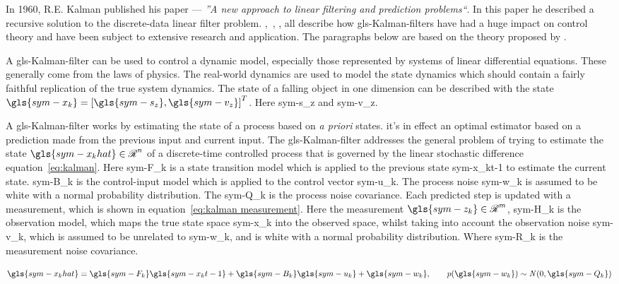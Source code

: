In 1960, R.E. Kalman published his paper \citet{kalman_new_1960} --- \textit{''A new approach to linear filtering and
prediction problems``}. In this paper he described a recursive solution to the discrete-data linear filter problem.
\citet{welch_introduction_2006},~\citet{dandrea_novel_control_2013}, \citet{chui_kalman_1999},
\citet{grewal_kalman_2015} all describe how \gls{gls-Kalman-filter}s have had a huge impact on control theory and have
been subject to extensive research and application. The paragraphs below are based on the theory proposed by
\citet{kalman_new_1960}.

A \gls{gls-Kalman-filter} can be used to control a dynamic model, especially those represented by systems of linear
differential equations. These generally come from the laws of physics. The real-world dynamics are used to model the
state dynamics which should contain a fairly faithful replication of the true system dynamics. The state of a falling
object in one dimension can be described with the state \( \gls{sym-x_k} = \left[\gls{sym-s_z}, \gls{sym-v_z}\right]^T
\). Here \gls{sym-s_z} and \gls{sym-v_z}.

A \gls{gls-Kalman-filter} works by estimating the state of a process based on \textit{a priori} states. it's in effect
an optimal estimator based on a prediction made from the previous input and current input. The \gls{gls-Kalman-filter}
addresses the general problem of trying to estimate the state \( \gls{sym-x_khat} \in \Re^n \) of a discrete-time
controlled process that is governed by the linear stochastic difference equation~\ref{eq:kalman}. Here \gls{sym-F_k} is
a state transition model which is applied to the previous state \gls{sym-x_kt-1} to estimate the current state. 
\gls{sym-B_k} is the control-input model which is applied to the control vector \gls{sym-u_k}. The process noise
\gls{sym-w_k} is assumed to be white with a normal probability distribution. The \gls{sym-Q_k} is the process noise
covariance. Each predicted step is updated with a measurement, which is shown in equation~\ref{eq:kalman measurement}.
Here the measurement \( \gls{sym-z_k} \in \Re^m  \), \gls{sym-H_k} is the observation model, which maps the true
state space \gls{sym-x_k} into the observed space, whilst taking into account the observation noise \gls{sym-v_k}, which
is assumed to be unrelated to \gls{sym-w_k}, and is white with a normal probability distribution. Where \gls{sym-R_k} is
the measurement noise covariance.

\begin{equation}
    \label{eq:kalman}
    \gls{sym-x_khat} = \gls{sym-F_k} \gls{sym-x_kt-1} + \gls{sym-B_k} \gls{sym-u_k} + \gls{sym-w_k}, \qquad p
	(\gls{sym-w_k}) \sim \mathit{N}(0,\gls{sym-Q_k})
\end{equation}

